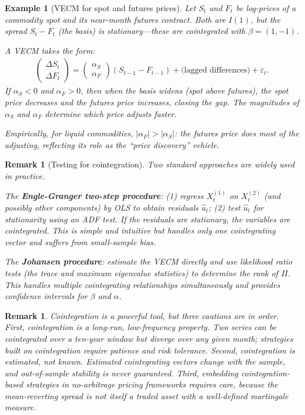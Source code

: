 \documentclass{report}
\theoremstyle{spacedplain}
\theoremstyle{spaceddefinition}
\newtheorem{example}[theorem]{Example}
\theoremstyle{spacedremark}
\newtheorem{remark}[theorem]{Remark}
\begin{document}
\begin{example}[VECM for spot and futures prices]
Let $S_t$ and $F_t$ be log-prices of a commodity spot and its near-month futures contract. Both are $I(1)$, but the spread $S_t - F_t$ (the basis) is stationary---these are cointegrated with $\beta = (1, -1)$.

A VECM takes the form:
\begin{align}
    \begin{pmatrix} \Delta S_t \\ \Delta F_t \end{pmatrix}
    =
    \begin{pmatrix} \alpha_S \\ \alpha_F \end{pmatrix}
    (S_{t-1} - F_{t-1})
    + \text{(lagged differences)}
    + \varepsilon_t.
\end{align}
If $\alpha_S < 0$ and $\alpha_F > 0$, then when the basis widens (spot above futures), the spot price decreases and the futures price increases, closing the gap. The magnitudes of $\alpha_S$ and $\alpha_F$ determine which price adjusts faster.

Empirically, for liquid commodities, $|\alpha_F| > |\alpha_S|$: the futures price does most of the adjusting, reflecting its role as the ``price discovery'' vehicle.
\end{example}

\begin{remark}[Testing for cointegration]
Two standard approaches are widely used in practice.

The \textbf{Engle-Granger two-step procedure}: (1) regress $X_t^{(1)}$ on $X_t^{(2)}$ (and possibly other components) by OLS to obtain residuals $\hat{u}_t$; (2) test $\hat{u}_t$ for stationarity using an ADF test. If the residuals are stationary, the variables are cointegrated. This is simple and intuitive but handles only one cointegrating vector and suffers from small-sample bias.

The \textbf{Johansen procedure}: estimate the VECM directly and use likelihood ratio tests (the trace and maximum eigenvalue statistics) to determine the rank of $\Pi$. This handles multiple cointegrating relationships simultaneously and provides confidence intervals for $\beta$ and $\alpha$.
\end{remark}

\begin{remark}
Cointegration is a powerful tool, but three cautions are in order. First, cointegration is a long-run, low-frequency property. Two series can be cointegrated over a ten-year window but diverge over any given month; strategies built on cointegration require patience and risk tolerance. Second, cointegration is estimated, not known. Estimated cointegrating vectors change with the sample, and out-of-sample stability is never guaranteed. Third, embedding cointegration-based strategies in no-arbitrage pricing frameworks requires care, because the mean-reverting spread is not itself a traded asset with a well-defined martingale measure.
\end{remark}
\end{document}

